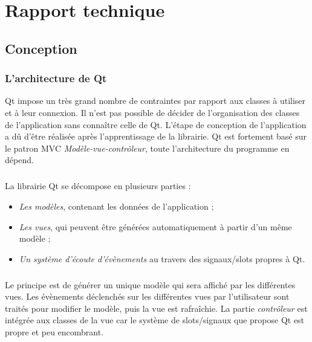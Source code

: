\chapter{Rapport technique}

\section{Conception}

\subsection{L'architecture de Qt}

Qt impose un très grand nombre de contraintes par rapport aux classes à utiliser et à leur connexion.
Il n'est pas possible de décider de l'organisation des classes de l'application sans connaître celle de Qt.
L'étape de conception de l'application a dû d'être réalisée après l'apprentissage de la librairie.
Qt est fortement basé sur le patron MVC \emph{Modèle-vue-contrôleur}, toute l'architecture du programme en dépend.
\paragraph{}

La librairie Qt se décompose en plusieurs parties :
\begin{itemize}
\item \emph{Les modèles}, contenant les données de l'application ;
\item \emph{Les vues}, qui peuvent être générées automatiquement à partir d'un même modèle ;
\item \emph{Un système d'écoute d'évènements} au travers des signaux/slots propres à Qt.
\end{itemize}

\paragraph{}
Le principe est de générer un unique modèle qui sera affiché par les différentes vues.
Les évènements déclenchés sur les différentes vues par l'utilisateur sont traités pour modifier le modèle, puis la vue est rafraîchie.
La partie \emph{contrôleur} est intégrée aux classes de la vue car le système de slots/signaux que propose Qt est propre et peu encombrant.

